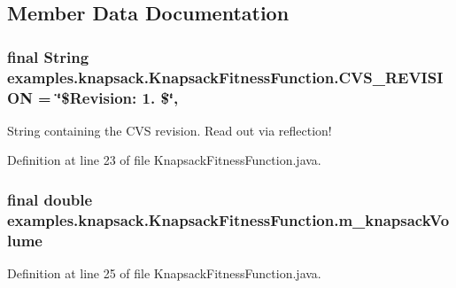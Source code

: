 \subsection{Member Data Documentation}
\hypertarget{classexamples_1_1knapsack_1_1_knapsack_fitness_function_a5c29ecffcf941f87258d2a20311fe914}{
\subsubsection[{C\-V\-S\-\_\-\-R\-E\-V\-I\-S\-I\-O\-N}]{\setlength{\rightskip}{0pt plus 5cm}final String examples.\-knapsack.\-Knapsack\-Fitness\-Function.\-C\-V\-S\-\_\-\-R\-E\-V\-I\-S\-I\-O\-N = \char`\"{}\$Revision\-: 1. \$\char`\"{}\hspace{0.3cm}{\ttfamily [static]}, {\ttfamily [private]}}}\label{classexamples_1_1knapsack_1_1_knapsack_fitness_function_a5c29ecffcf941f87258d2a20311fe914}
String containing the C\-V\-S revision. Read out via reflection! 

Definition at line 23 of file Knapsack\-Fitness\-Function.\-java.

\hypertarget{classexamples_1_1knapsack_1_1_knapsack_fitness_function_aadc99ed7dd059c4858f1288d60a6f46f}{
\subsubsection[{m\-\_\-knapsack\-Volume}]{\setlength{\rightskip}{0pt plus 5cm}final double examples.\-knapsack.\-Knapsack\-Fitness\-Function.\-m\-\_\-knapsack\-Volume\hspace{0.3cm}{\ttfamily [private]}}}\label{classexamples_1_1knapsack_1_1_knapsack_fitness_function_aadc99ed7dd059c4858f1288d60a6f46f}


Definition at line 25 of file Knapsack\-Fitness\-Function.\-java.



